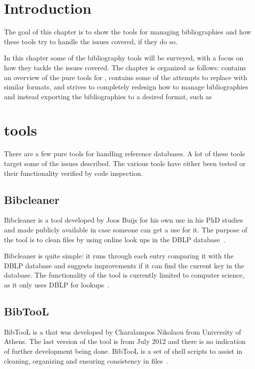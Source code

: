 \section{Introduction}
The goal of this chapter is to show the tools for managing
bibliographies and how these tools try to handle the issues covered,
if they do so.

In this chapter some of the bibliography tools will be surveyed, with
a focus on how they tackle the issues covered.  The chapter is
organized as follows:  contains an overview
of the pure tools for {\bibtex}, 
contains some of the attempts to replace {\bibtex} with similar
formats, and  strives to
completely redesign how to manage bibliographies and instead
exporting the bibliographies to a desired format, such as {\bibtex}


\section{{\bibtex} tools}
\label{sec:bibtex_tools}
There are a few pure {\bibtex} tools for handling reference databases.
A lot of these tools target some of the issues described.  The
various tools have either been tested or their functionality verified
by code inspection.

\subsection{Bibcleaner}
Bibcleaner is a tool developed by Joos Buijs for his own use in his
PhD studies and made publicly available in case someone can get a use
for it.  The purpose of the tool is to clean {\bibtex} files by using
online look ups in the DBLP database~\cite{bibcleaner_question,
  bibcleaner_source}.

Bibcleaner is quite simple: it runs through each entry comparing it
with the DBLP database and suggests improvements if it can find the
current key in the database.  The functionality of the tool is
currently limited to computer science, as it only uses DBLP for
lookups~\cite{bibcleaner_source}.

\subsection{BibTooL}
BibTooL is a {\bibtex} that was developed by Charalampos Nikolaou from
University of Athens.  The last version of the tool is from July 2012
and there is no indication of further development being done.  BibTooL
is a set of shell scripts to assist in cleaning, organizing and
ensuring consistency in {\bibtex} files~\cite{bibtool_site}.

